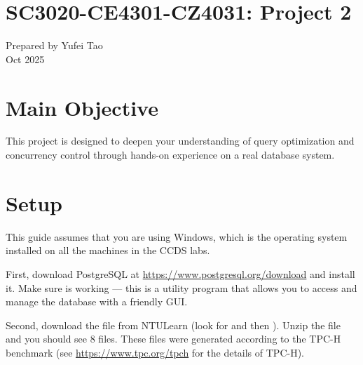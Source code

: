 


\usepackage{amsfonts, amsmath, amssymb, amsthm}
\usepackage{comment}
\usepackage{graphicx}
\usepackage{hyperref}
\usepackage{ifthen}
\usepackage{latexsym}
\usepackage[normalem]{ulem}



\def\dom{\prec}
\def\T{\mathcal{T}}

\def\vgap{\vspace{3mm}}




\section*{SC3020-CE4301-CZ4031: Project 2}

Prepared by Yufei Tao \\
Oct 2025 \\


\section{Main Objective}

This project is designed to deepen your understanding of query optimization and concurrency control through hands-on experience on a real database system.

\section{Setup}

This guide assumes that you are using Windows, which is the operating system installed on all the machines in the CCDS labs.

\vgap

First, download PostgreSQL at \url{https://www.postgresql.org/download} and install it. Make sure  is working --- this is a utility program that allows you to access and manage the database with a friendly GUI.

\vgap

Second, download the file  from NTULearn (look for  and then ). Unzip the file and you should see 8  files. These files were generated according to the TPC-H benchmark (see \url{https://www.tpc.org/tpch} for the details of TPC-H).


